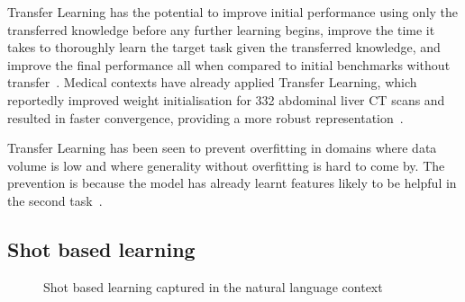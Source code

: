 \documentclass[12pt,twoside]{report}
\begin{document}
Transfer Learning has the potential to improve initial performance using only the transferred knowledge before any further learning begins, improve the time it takes to thoroughly learn the target task given the transferred knowledge, and improve the final performance all when compared to initial benchmarks without transfer~\cite{torrey-handbook}. Medical contexts have already applied Transfer Learning, which reportedly improved weight initialisation for 332 abdominal liver CT scans and resulted in faster convergence, providing a more robust representation~\cite{liver-lesion-via-transfer-learning}.

Transfer Learning has been seen to prevent overfitting in domains where data volume is low and where generality without overfitting is hard to come by. The prevention is because the model has already learnt features likely to be helpful in the second task~\cite{geeks-transfer-learning}. 


\subsection{Shot based learning}

\begin{figure}[H]
  \centering
  \caption{Shot based learning captured in the natural language context~\cite{openaishotbasedlearning}}
\end{figure}
\end{document}

